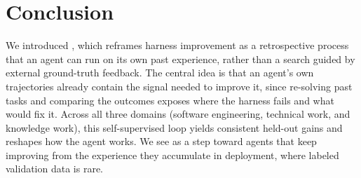 \section{Conclusion}

We introduced \method{}, which reframes harness improvement as a retrospective process that an agent can run on its own past experience, rather than a search guided by external ground-truth feedback.
The central idea is that an agent's own trajectories already contain the signal needed to improve it, since re-solving past tasks and comparing the outcomes exposes where the harness fails and what would fix it.
Across all three domains (software engineering, technical work, and knowledge work), this self-supervised loop yields consistent held-out gains and reshapes how the agent works.
We see \method{} as a step toward agents that keep improving from the experience they accumulate in deployment, where labeled validation data is rare.
